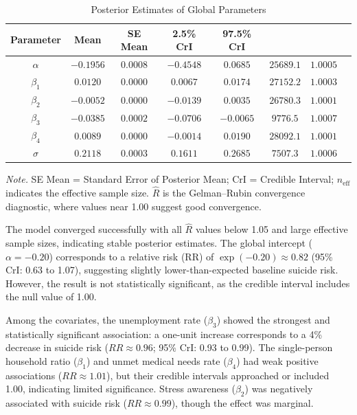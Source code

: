 \documentclass[11pt]{article}
\begin{document}
	\begin{table}[H]
		\centering
		\caption{Posterior Estimates of Global Parameters}
		\renewcommand{\arraystretch}{1.3}
		\begin{tabular}{cccccccc}
			\hline
			\textbf{Parameter} & \textbf{Mean} & \textbf{SE Mean} & \textbf{2.5\% CrI} & \textbf{97.5\% CrI} & \boldmath{$n_\text{eff}$} & \boldmath{$\hat{R}$} \\
			\hline
			$\alpha$   & $-0.1956$ & $0.0008$ & $-0.4548$ & $0.0685$ & $25689.1$ & $1.0005$ \\
			$\beta_1$  & $0.0120$  & $0.0000$ & $0.0067$  & $0.0174$ & $27152.2$ & $1.0003$ \\
			$\beta_2$  & $-0.0052$ & $0.0000$ & $-0.0139$ & $0.0035$ & $26780.3$ & $1.0001$ \\
			$\beta_3$  & $-0.0385$ & $0.0002$ & $-0.0706$ & $-0.0065$ & $9776.5$  & $1.0007$ \\
			$\beta_4$  & $0.0089$  & $0.0000$ & $-0.0014$ & $0.0190$ & $28092.1$ & $1.0001$ \\
			$\sigma$   & $0.2118$  & $0.0003$ & $0.1611$  & $0.2685$ & $7507.3$  & $1.0006$ \\
			\hline
		\end{tabular}
		
		\vspace{0.5em}
		
		\begin{minipage}{0.9\textwidth}
			\vspace{0.5em}
			\footnotesize
			\textit{Note.} SE Mean = Standard Error of Posterior Mean; CrI = Credible Interval; $n_\text{eff}$ indicates the effective sample size. $\hat{R}$ is the Gelman–Rubin convergence diagnostic, where values near 1.00 suggest good convergence.
		\end{minipage}
		\label{tab:icar_results}
	\end{table}
	
	The model converged successfully with all $\hat{R}$ values below 1.05 and large effective sample sizes, indicating stable posterior estimates. The global intercept ($\alpha = -0.20$) corresponds to a relative risk (RR) of $\exp(-0.20) \approx 0.82$ (95\% CrI: 0.63 to 1.07), suggesting slightly lower-than-expected baseline suicide risk. However, the result is not statistically significant, as the credible interval includes the null value of 1.00.
	
	Among the covariates, the unemployment rate ($\beta_3$) showed the strongest and statistically significant association: a one-unit increase corresponds to a 4\% decrease in suicide risk ($RR \approx 0.96$; 95\% CrI: 0.93 to 0.99). The single-person household ratio ($\beta_1$) and unmet medical needs rate ($\beta_4$) had weak positive associations ($RR \approx 1.01$), but their credible intervals approached or included 1.00, indicating limited significance. Stress awareness ($\beta_2$) was negatively associated with suicide risk ($RR \approx 0.99$), though the effect was marginal.
	
\end{document}
